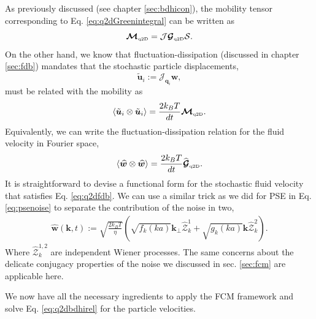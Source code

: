 \documentclass[twoside,openright,titlepage,numbers=noenddot,%
headinclude,footinclude,cleardoublepage=empty,abstract=on,
BCOR=5mm,fontsize=11pt, dvipsnames, paper=b5
]{scrreprt}
\renewcommand{\vec}[1]{\bm{#1}}
\newcommand{\tens}[1]{\bm{\mathcal{#1}}}
\newcommand{\oper}[1]{\mathcal{#1}}
\newcommand{\kT}{k_B T}
\newcommand{\half}{\frac{1}{2}}
\newcommand{\fou}[1]{\widehat{#1}}
\newcommand{\ppos}{q}
\newcommand{\pvel}{u}
\newcommand{\qtd}{\text{\tiny q2D}}
\begin{document}
As previously discussed (see chapter \ref{sec:bdhicon}), the mobility tensor corresponding to Eq. \eqref{eq:q2dGreenintegral} can be written as
\begin{equation}
  \tens{M}_{\qtd} = \oper{J}\tens{G}_{\qtd}\oper{S}.
\end{equation}
On the other hand, we know that fluctuation-dissipation (discussed in chapter \ref{sec:fdb}) mandates that the stochastic particle displacements,
\begin{equation}
\tilde{\vec{\pvel}}_i := \oper{J}_{\vec{\ppos}_i}\vec{w},
\end{equation}
must be related with the mobility as
\begin{equation}
  \langle\tilde{\vec{\pvel}}_i\otimes\tilde{\vec{\pvel}}_i\rangle = \frac{2\kT}{dt} \tens{M}_{\qtd}.
\end{equation}
Equivalently, we can write the fluctuation-dissipation relation for the fluid velocity in Fourier space,
\begin{equation}
  \label{eq:q2dfdb}
  \left\langle\fou{\vec{w}}\otimes \fou{\vec{w}}\right\rangle = \frac{2\kT}{dt} \fou{\tens{G}}_{\qtd}.
\end{equation}
It is straightforward to devise a functional form for the stochastic fluid velocity that satisfies Eq. \eqref{eq:q2dfdb}.
We can use a similar trick as we did for \gls{PSE} in Eq. \eqref{eq:psenoise} to separate the contribution of the noise in two,
\begin{equation}
  \begin{aligned}
    \fou{\vec{w}}(\vec{k}, t) := \sqrt{\frac{2\kT}{\eta}}\left(\sqrt{f_k(ka)}\vec{k}_\perp\fou{\tens{Z}}^1_k + \sqrt{g_k(ka)}\vec{k}\fou{\tens{Z}}^2_k\right).
  \end{aligned}
\end{equation}
Where $\fou{\tens{Z}}^{1,2}_k$ are independent Wiener processes. The same concerns about the delicate conjugacy properties of the noise we discussed in sec. \ref{sec:fcm} are applicable here.

We now have all the necessary ingredients to apply the \gls{FCM} framework and solve Eq. \eqref{eq:q2dbdhirel} for the particle velocities.
\end{document}

